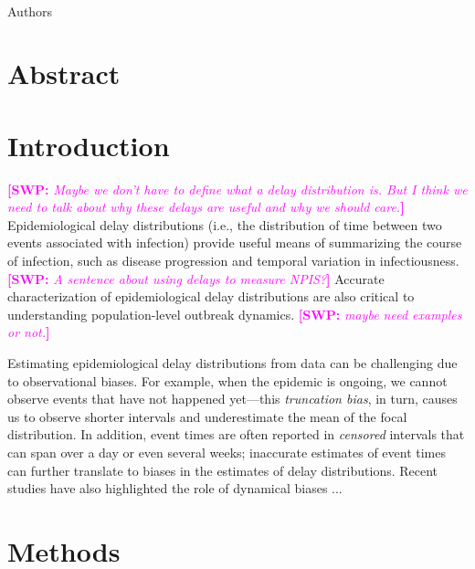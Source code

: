 \documentclass[12pt]{article}
\date{\today}
\newcommand{\comment}{\showcomment}
\newcommand{\showcomment}[3]{\textcolor{#1}{\textbf{[#2: }\textsl{#3}\textbf{]}}}
\newcommand{\swp}[1]{\comment{magenta}{SWP}{#1}}
\begin{document}
\begin{flushleft}{
	\Large
	\textbf{}
}
\newline
\\
Authors
\bigskip

\bigskip

\section*{Abstract}

\end{flushleft}

\pagebreak

\section{Introduction}

\swp{Maybe we don't have to define what a delay distribution is. But I think we need to talk about why these delays are useful and why we should care.}
Epidemiological delay distributions (i.e., the distribution of time between two events associated with infection) provide useful means of summarizing the course of infection, such as disease progression \citep{lauer2020incubation,verity2020estimates} and temporal variation in infectiousness.
\swp{A sentence about using delays to measure NPIS?}
Accurate characterization of epidemiological delay distributions are also critical to understanding population-level outbreak dynamics. \swp{maybe need examples or not.}

Estimating epidemiological delay distributions from data can be challenging due to observational biases.
For example, when the epidemic is ongoing, we cannot observe events that have not happened yet---this \emph{truncation bias}, in turn, causes us to observe shorter intervals and underestimate the mean of the focal distribution.
In addition, event times are often reported in \emph{censored} intervals that can span over a day or even several weeks;
inaccurate estimates of event times can further translate to biases in the estimates of delay distributions.
Recent studies have also highlighted the role of dynamical biases ...

\section{Methods}
\end{document}

